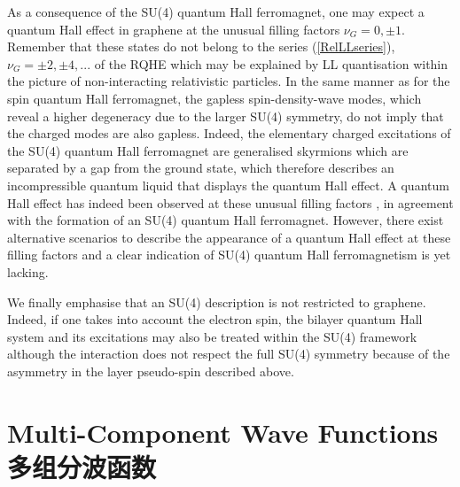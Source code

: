 \documentclass[10pt]{book}
\begin{document}
As a consequence of the SU(4) quantum Hall ferromagnet, one may expect a quantum Hall effect in graphene at the unusual filling factors
$\nu_G=0,\pm 1$. Remember that these states do not belong to the series (\ref{RelLLseries}), 
$\nu_G=\pm 2,\pm 4, ...$ of the RQHE which may be explained by LL quantisation within the picture of non-interacting 
relativistic particles. 
In the same manner as for the spin quantum Hall ferromagnet, the gapless spin-density-wave modes, which reveal a higher 
degeneracy due to the larger SU(4) symmetry, do not imply that the charged modes are also gapless. Indeed, the 
elementary charged excitations of the SU(4) quantum Hall ferromagnet are generalised skyrmions \cite{yang,DGLM}
which are separated by a gap from the ground state, which therefore describes an incompressible quantum liquid that
displays the quantum Hall effect. A quantum Hall effect has indeed been observed at these unusual filling factors \cite{zhang},
in agreement with the formation of an SU(4) quantum Hall ferromagnet. However, there exist alternative scenarios
to describe the appearance of a quantum Hall effect at these filling factors \cite{gusynin,fuchs,herbut} and a
clear indication of SU(4) quantum Hall ferromagnetism is yet lacking.

We finally emphasise that an SU(4) description is not restricted to graphene. Indeed, if one takes into account the
electron spin, the bilayer quantum Hall system and its excitations
may also be treated within the SU(4) framework \cite{arovas,ezawaSU4,ezawa,DGLM} although the interaction does not respect
the full SU(4) symmetry because of the asymmetry in the layer pseudo-spin described above.






\section[多组分波函数]{Multi-Component Wave Functions\\\bf 多组分波函数}
\label{MCWF}
\end{document}
